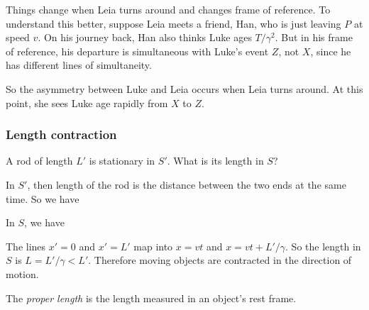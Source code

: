\documentclass[a4paper]{article}
\begin{document}
Things change when Leia turns around and changes frame of reference. To understand this better, suppose Leia meets a friend, Han, who is just leaving $P$ at speed $v$. On his journey back, Han also thinks Luke ages $T/\gamma^2$. But in his frame of reference, his departure is simultaneous with Luke's event $Z$, not $X$, since he has different lines of simultaneity.

So the asymmetry between Luke and Leia occurs when Leia turns around. At this point, she sees Luke age rapidly from $X$ to $Z$.

\subsubsection*{Length contraction}
A rod of length $L'$ is stationary in $S'$. What is its length in $S$?

In $S'$, then length of the rod is the distance between the two ends at the same time. So we have
\begin{center}
\end{center}
In $S$, we have
\begin{center}
\end{center}
The lines $x' = 0$ and $x' = L'$ map into $x = vt$ and $x = vt + L'/\gamma$. So the length in $S$ is $L = L'/\gamma < L'$. Therefore moving objects are contracted in the direction of motion.
\begin{defi}
  The \emph{proper length} is the length measured in an object's rest frame.
\end{defi}
\end{document}
